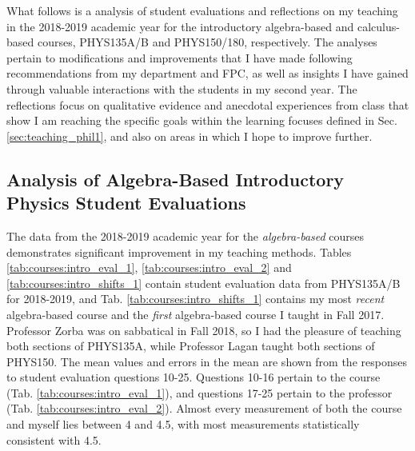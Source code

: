 \documentclass[../../main.tex]{subfiles}
\begin{document}
\label{sec:oof}

What follows is a analysis of student evaluations and reflections on my teaching in the 2018-2019 academic year for the introductory algebra-based and calculus-based courses, PHYS135A/B and PHYS150/180, respectively.  The analyses pertain to modifications and improvements that I have made following recommendations from my department and FPC, as well as insights I have gained through valuable interactions with the students in my second year.  The reflections focus on qualitative evidence and anecdotal experiences from class that show I am reaching the specific goals within the learning focuses defined in Sec. \ref{sec:teaching_phil1}, and also on areas in which I hope to improve further.  \\ \hspace{0.1cm}

\subsection{Analysis of Algebra-Based Introductory Physics Student Evaluations}

The data from the 2018-2019 academic year for the \textit{algebra-based} courses demonstrates significant improvement in my teaching methods.  Tables \ref{tab:courses:intro_eval_1}, \ref{tab:courses:intro_eval_2} and \ref{tab:courses:intro_shifts_1} contain student evaluation data from PHYS135A/B for 2018-2019, and Tab. \ref{tab:courses:intro_shifts_1} contains my most \textit{recent} algebra-based course and the \textit{first} algebra-based course I taught in Fall 2017.  Professor Zorba was on sabbatical in Fall 2018, so I had the pleasure of teaching both sections of PHYS135A, while Professor Lagan taught both sections of PHYS150.  The mean values and errors in the mean are shown from the responses to student evaluation questions 10-25.  Questions 10-16 pertain to the course (Tab. \ref{tab:courses:intro_eval_1}), and questions 17-25 pertain to the professor (Tab. \ref{tab:courses:intro_eval_2}).  Almost every measurement of both the course and myself lies between 4 and 4.5, with most measurements statistically consistent with 4.5. \\ \hspace{0.1cm}
\end{document}
